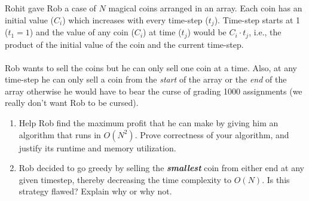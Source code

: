 \documentclass{common/cs157}
\begin{document}
\begin{problem}{3}
Rohit gave Rob a case of $N$ magical coins arranged in an array. Each coin has an initial value ($C_i$) which increases with every time-step ($t_j$). Time-step starts at 1 ($t_1 = 1$) and the value of any coin ($C_i$) at time ($t_j$) would be $C_i \cdot t_j$, i.e., the product of the initial value of the coin and the current time-step. 
\\\\
Rob wants to sell the coins but he can only sell one coin at a time. Also, at any time-step he can only sell a coin from the \textit{start} of the array or the \textit{end} of the array otherwise he would have to bear the curse of grading 1000 assignments (we really don't want Rob to be cursed).
\begin{enumerate}
    \item Help Rob find the maximum profit that he can make by giving him an algorithm that runs in $O(N^2)$. Prove correctness of your algorithm, and justify its runtime and memory utilization.
    \item Rob decided to go greedy by selling the \textit{\textbf{smallest}} coin from either end at any given timestep, thereby decreasing the time complexity to $O(N)$. Is this strategy flawed? Explain why or why not.
\end{enumerate}
\end{problem}
\end{document}
